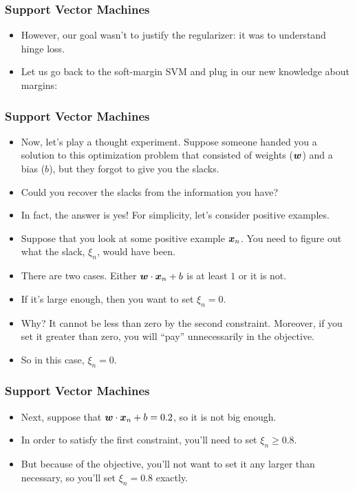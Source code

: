 \documentclass[trans]{beamer}
\begin{document}
\begin{frame}
  \frametitle{Support Vector Machines}
\begin{itemize}
\item 
However, our goal wasn't to justify the regularizer: it was to
understand hinge loss.
\item   Let us go back to the soft-margin SVM and
plug in our new knowledge about margins:
%
%
\end{itemize}
\end{frame}
\begin{frame}
  \frametitle{Support Vector Machines}
\begin{itemize}
\item 
Now, let's play a thought experiment.  Suppose someone handed you a
solution to this optimization problem that consisted of weights
(${\boldsymbol{w}}$) and a bias ($b$), but they forgot to give you the slacks.
\item 
Could you recover the slacks from the information you have?
\item
In fact, the answer is yes!  For simplicity, let's consider positive
examples. 
\item  Suppose that you look at some positive example ${\boldsymbol{x}}_n$.
You need to figure out what the slack, $\xi_n$, would have been.
\item 
There are two cases.  Either ${\boldsymbol{w}} \cdot {\boldsymbol{x}}_n+b$ is at least $1$ or
it is not.
\item   If it's large enough, then you want to set $\xi_n = 0$.
\item
Why?  It cannot be less than zero by the second constraint.  Moreover,
if you set it greater than zero, you will ``pay'' unnecessarily in the
objective. 
\item  So in this case, $\xi_n=0$. 
\end{itemize}
\end{frame}
\begin{frame}
  \frametitle{Support Vector Machines}
\begin{itemize}
\item 
 Next, suppose that
${\boldsymbol{w}} \cdot {\boldsymbol{x}}_n+b = 0.2$, so it is not big enough.  
\item In order to
satisfy the first constraint, you'll need to set $\xi_n \geq 0.8$.
\item But because of the objective, you'll not want to set it any larger
than necessary, so you'll set $\xi_n = 0.8$ exactly.
\end{itemize}
\end{frame}
\end{document}

